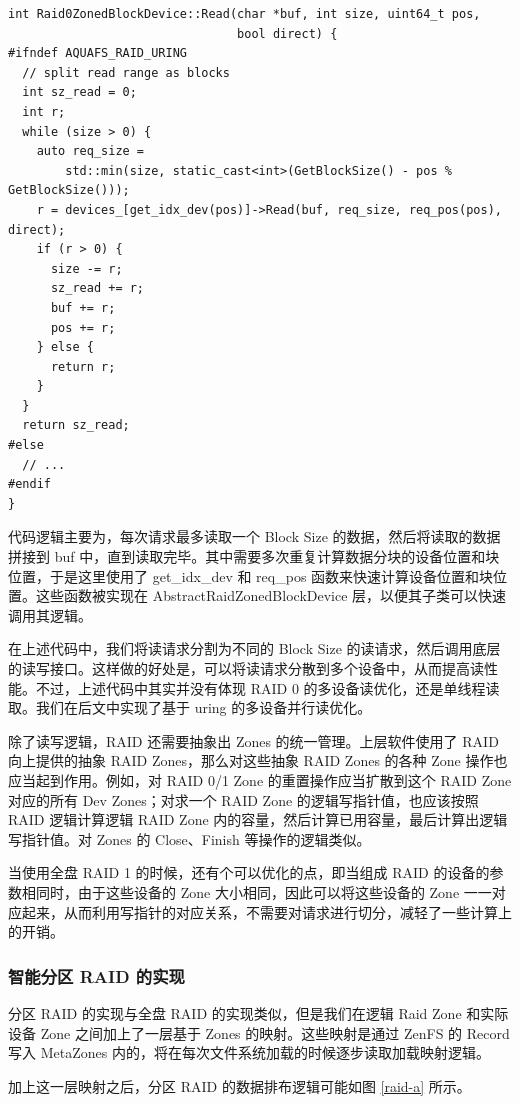 \begin{lstlisting}
int Raid0ZonedBlockDevice::Read(char *buf, int size, uint64_t pos,
                                bool direct) {
#ifndef AQUAFS_RAID_URING
  // split read range as blocks
  int sz_read = 0;
  int r;
  while (size > 0) {
    auto req_size =
        std::min(size, static_cast<int>(GetBlockSize() - pos % GetBlockSize()));
    r = devices_[get_idx_dev(pos)]->Read(buf, req_size, req_pos(pos), direct);
    if (r > 0) {
      size -= r;
      sz_read += r;
      buf += r;
      pos += r;
    } else {
      return r;
    }
  }
  return sz_read;
#else
  // ...
#endif
}
\end{lstlisting}

代码逻辑主要为，每次请求最多读取一个 Block Size 的数据，然后将读取的数据拼接到 buf 中，直到读取完毕。其中需要多次重复计算数据分块的设备位置和块位置，于是这里使用了 get\_idx\_dev 和 req\_pos 函数来快速计算设备位置和块位置。这些函数被实现在 AbstractRaidZonedBlockDevice 层，以便其子类可以快速调用其逻辑。

在上述代码中，我们将读请求分割为不同的 Block Size 的读请求，然后调用底层的读写接口。这样做的好处是，可以将读请求分散到多个设备中，从而提高读性能。不过，上述代码中其实并没有体现 RAID 0 的多设备读优化，还是单线程读取。我们在后文中实现了基于 uring 的多设备并行读优化。

除了读写逻辑，RAID 还需要抽象出 Zones 的统一管理。上层软件使用了 RAID 向上提供的抽象 RAID Zones，那么对这些抽象 RAID Zones 的各种 Zone 操作也应当起到作用。例如，对 RAID 0/1 Zone 的重置操作应当扩散到这个 RAID Zone 对应的所有 Dev Zones；对求一个 RAID Zone 的逻辑写指针值，也应该按照 RAID 逻辑计算逻辑 RAID Zone 内的容量，然后计算已用容量，最后计算出逻辑写指针值。对 Zones 的 Close、Finish 等操作的逻辑类似。

当使用全盘 RAID 1 的时候，还有个可以优化的点，即当组成 RAID 的设备的参数相同时，由于这些设备的 Zone 大小相同，因此可以将这些设备的 Zone 一一对应起来，从而利用写指针的对应关系，不需要对请求进行切分，减轻了一些计算上的开销。

\subsubsection{智能分区 RAID 的实现}

分区 RAID 的实现与全盘 RAID 的实现类似，但是我们在逻辑 Raid Zone 和实际设备 Zone 之间加上了一层基于 Zones 的映射。这些映射是通过 ZenFS 的 Record 写入 MetaZones 内的，将在每次文件系统加载的时候逐步读取加载映射逻辑。

加上这一层映射之后，分区 RAID 的数据排布逻辑可能如图 \ref{raid-a} 所示。

